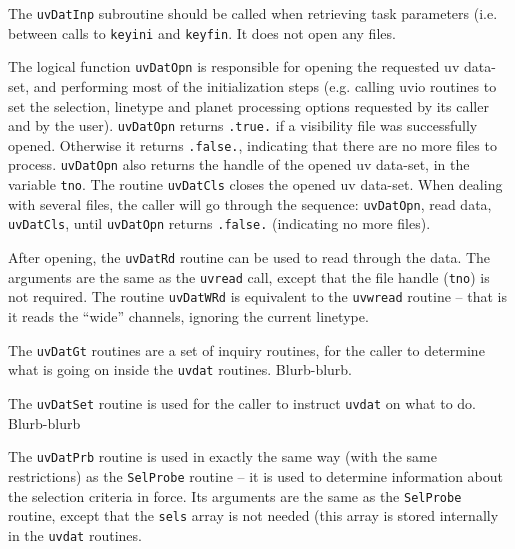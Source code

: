 The {\tt uvDatInp} subroutine should be called when retrieving task parameters
(i.e. between calls to {\tt keyini} and {\tt keyfin}. It does not open any files.

The logical function {\tt uvDatOpn} is responsible for opening the requested
uv data-set, and performing most of the initialization steps (e.g. calling
uvio routines to set the selection, linetype and planet processing options
requested by its caller and by the user). {\tt uvDatOpn} returns {\tt .true.}
if a visibility file was successfully opened. Otherwise it returns {\tt .false.},
indicating that there are no more files to process. {\tt uvDatOpn} also returns
the handle of the opened uv data-set, in the variable {\tt tno}. The routine
{\tt uvDatCls} closes the opened uv data-set. When dealing with several files,
the caller will go through the sequence: {\tt uvDatOpn}, read data, {\tt uvDatCls},
until {\tt uvDatOpn} returns {\tt .false.} (indicating no more files).

After opening, the {\tt uvDatRd} routine can be used to read through the data.
The arguments are the same as the {\tt uvread} call, except that the file handle
({\tt tno}) is not required. The routine {\tt uvDatWRd} is equivalent to the
{\tt uvwread} routine -- that is it reads the ``wide'' channels, ignoring the
current linetype.

The {\tt uvDatGt} routines are a set of inquiry routines, for the caller to
determine what is going on inside the {\tt uvdat} routines. Blurb-blurb.

The {\tt uvDatSet} routine is used for the caller to instruct {\tt uvdat} on what to
do. Blurb-blurb

The {\tt uvDatPrb} routine is used in exactly the same way (with the same
restrictions) as the {\tt SelProbe} routine -- it is used to
determine information about the selection criteria in force. Its arguments are the
same as the {\tt SelProbe} routine, except that the {\tt sels} array is not needed
(this array is stored internally in the {\tt uvdat} routines.

